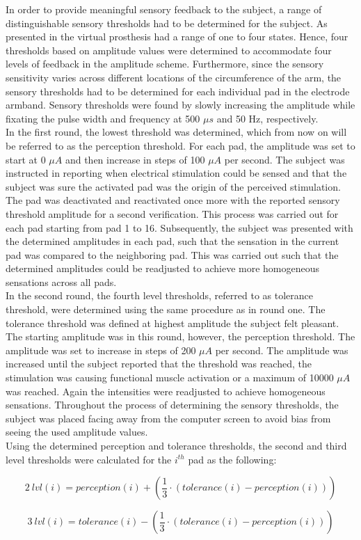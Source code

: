 In order to provide meaningful sensory feedback to the subject, a range of distinguishable sensory thresholds had to be determined for the subject. As presented in  the virtual prosthesis had a range of one to four states. Hence, four thresholds based on amplitude values were determined to accommodate four levels of feedback in the amplitude scheme. Furthermore, since the sensory sensitivity varies across different locations of the circumference of the arm, the sensory thresholds had to be determined for each individual pad in the electrode armband. Sensory thresholds were found by slowly increasing the amplitude while fixating the pulse width and frequency at 500 $\mu s $ and 50 Hz, respectively. \\
In the first round, the lowest threshold was determined, which from now on will be referred to as the perception threshold. For each pad, the amplitude was set to start at 0 $\mu A $ and then increase in steps of 100 $\mu A $ per second. The subject was instructed in reporting when electrical stimulation could be sensed and that the subject was sure the activated pad was the origin of the perceived stimulation. The pad was deactivated and reactivated once more with the reported sensory threshold amplitude for a second verification. This process was carried out for each pad starting from pad 1 to 16. Subsequently, the subject was presented with the determined amplitudes in each pad, such that the sensation in the current pad was compared to the neighboring pad. This was carried out such that the determined amplitudes could be readjusted to achieve more homogeneous sensations across all pads.  \\
In the second round, the fourth level thresholds, referred to as tolerance threshold, were determined using the same procedure as in round one. The tolerance threshold was defined at highest amplitude the subject felt pleasant. The starting amplitude was in this round, however, the perception threshold. The amplitude was set to increase in steps of 200 $\mu A $ per second. The amplitude was increased until the subject reported that the threshold was reached, the stimulation was causing functional muscle activation or a maximum of 10000 $\mu A $ was reached. Again the intensities were readjusted to achieve homogeneous sensations. Throughout the process of determining the sensory thresholds, the subject was placed facing away from the computer screen to avoid bias from seeing the used amplitude values.  \\ 
Using the determined perception and tolerance thresholds, the second and third level thresholds were calculated for the $i^{th}$ pad as the following:

\begin{equation}
2~lvl(i) = perception(i) + (\frac{1}{3} \cdot (tolerance(i) - perception(i)))
\end{equation}

\begin{equation}
3~lvl(i) = tolerance(i) - (\frac{1}{3} \cdot (tolerance(i) - perception(i)))
\end{equation}


       